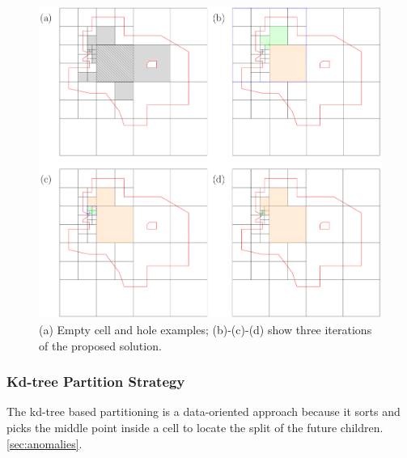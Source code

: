 \begin{figure}
    \centering
    \includegraphics[width=\linewidth]{chapterSDCEL/orphan_cells.pdf}    
    \caption{(a) Empty cell and hole examples; (b)-(c)-(d) show three iterations of the proposed solution.} \label{fig:orphan_cells}
\end{figure}

\subsubsection{Kd-tree Partition Strategy} \label{sec:kdtreestrategy}


The kd-tree based partitioning is a data-oriented approach because it sorts and picks the middle point inside a cell to locate the split of the future children. 
\ref{sec:anomalies}.

